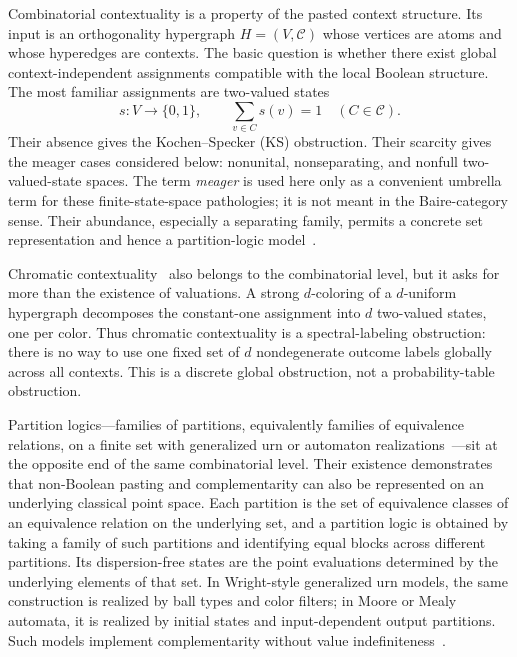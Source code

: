 \documentclass[aps,pra,twocolumn,superscriptaddress,nofootinbib]{revtex4-2}
\newcommand{\C}{\mathcal{C}}
\begin{document}
Combinatorial contextuality is a property of the pasted context structure.  Its input is an orthogonality hypergraph $H=(V,\C)$ whose vertices are atoms and whose hyperedges are contexts.  The basic question is whether there exist global context-independent assignments compatible with the local Boolean structure.  The most familiar assignments are two-valued states
\begin{equation}
        s:V\to\{0,1\},
        \qquad \sum_{v\in C}s(v)=1\quad(C\in\C).
\end{equation}
Their absence gives the Kochen--Specker (KS) obstruction.  Their scarcity gives the meager cases considered below: nonunital, nonseparating, and nonfull two-valued-state spaces.  The term \emph{meager} is used here only as a convenient umbrella term for these finite-state-space pathologies; it is not meant in the Baire-category sense.  Their abundance, especially a separating family, permits a concrete set representation and hence a partition-logic model~\cite{svozil-2001-eua}.

Chromatic contextuality~\cite{svozil-2025-color} also belongs to the combinatorial level, but it asks for more than the existence of valuations.  A strong $d$-coloring of a $d$-uniform hypergraph decomposes the constant-one assignment into $d$ two-valued states, one per color.  Thus chromatic contextuality is a spectral-labeling obstruction: there is no way to use one fixed set of $d$ nondegenerate outcome labels globally across all contexts.  This is a discrete global obstruction, not a probability-table obstruction.

Partition logics---families of partitions, equivalently families of
equivalence relations, on a finite set with generalized urn or automaton
realizations~\cite{svozil-2001-eua,svozil-2018-b}---sit at the opposite
end of the same combinatorial level.  Their existence demonstrates that
non-Boolean pasting and complementarity can also be represented on an
underlying classical point space.  Each partition is the set of equivalence
classes of an equivalence relation on the underlying set, and a partition
logic is obtained by taking a family of such partitions and identifying
equal blocks across different partitions.  Its dispersion-free states are
the point evaluations determined by the underlying elements of that set.
In Wright-style generalized urn models, the same construction is realized
by ball types and color filters; in Moore or Mealy automata, it is realized
by initial states and input-dependent output partitions.  Such models
implement complementarity without value indefiniteness~\cite{schaller-92,svozil-2018-b}.
\end{document}
